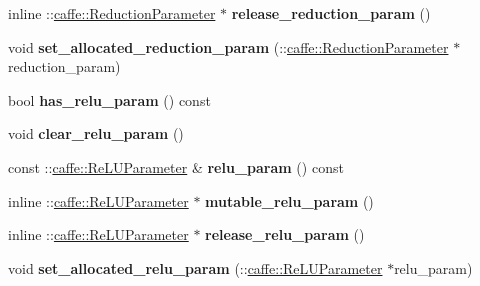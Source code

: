 \begin{DoxyCompactItemize}
\item 
\mbox{\label{classcaffe_1_1_layer_parameter_a483618f4bb5a457f3ec297bc349b33db}} 
inline \+::\mbox{\hyperlink{classcaffe_1_1_reduction_parameter}{caffe\+::\+Reduction\+Parameter}} $\ast$ {\bfseries release\+\_\+reduction\+\_\+param} ()
\item 
\mbox{\label{classcaffe_1_1_layer_parameter_ac718575636cdb113f35785b8c09f73bb}} 
void {\bfseries set\+\_\+allocated\+\_\+reduction\+\_\+param} (\+::\mbox{\hyperlink{classcaffe_1_1_reduction_parameter}{caffe\+::\+Reduction\+Parameter}} $\ast$reduction\+\_\+param)
\item 
\mbox{\label{classcaffe_1_1_layer_parameter_a57e1d92f6b9aa017b08768b3c886952c}} 
bool {\bfseries has\+\_\+relu\+\_\+param} () const
\item 
\mbox{\label{classcaffe_1_1_layer_parameter_a61541c1d18f3eb07233b9d11768761ed}} 
void {\bfseries clear\+\_\+relu\+\_\+param} ()
\item 
\mbox{\label{classcaffe_1_1_layer_parameter_a16236f384f5e567cdb95eaf5e98cedb1}} 
const \+::\mbox{\hyperlink{classcaffe_1_1_re_l_u_parameter}{caffe\+::\+Re\+L\+U\+Parameter}} \& {\bfseries relu\+\_\+param} () const
\item 
\mbox{\label{classcaffe_1_1_layer_parameter_ac76a868b3d064df185048c681d57a664}} 
inline \+::\mbox{\hyperlink{classcaffe_1_1_re_l_u_parameter}{caffe\+::\+Re\+L\+U\+Parameter}} $\ast$ {\bfseries mutable\+\_\+relu\+\_\+param} ()
\item 
\mbox{\label{classcaffe_1_1_layer_parameter_a0651e4289003878e25b2ab3f08d99580}} 
inline \+::\mbox{\hyperlink{classcaffe_1_1_re_l_u_parameter}{caffe\+::\+Re\+L\+U\+Parameter}} $\ast$ {\bfseries release\+\_\+relu\+\_\+param} ()
\item 
\mbox{\label{classcaffe_1_1_layer_parameter_a9c3361f356d4b679778c023af2eb1c85}} 
void {\bfseries set\+\_\+allocated\+\_\+relu\+\_\+param} (\+::\mbox{\hyperlink{classcaffe_1_1_re_l_u_parameter}{caffe\+::\+Re\+L\+U\+Parameter}} $\ast$relu\+\_\+param)

\end{DoxyCompactItemize}
